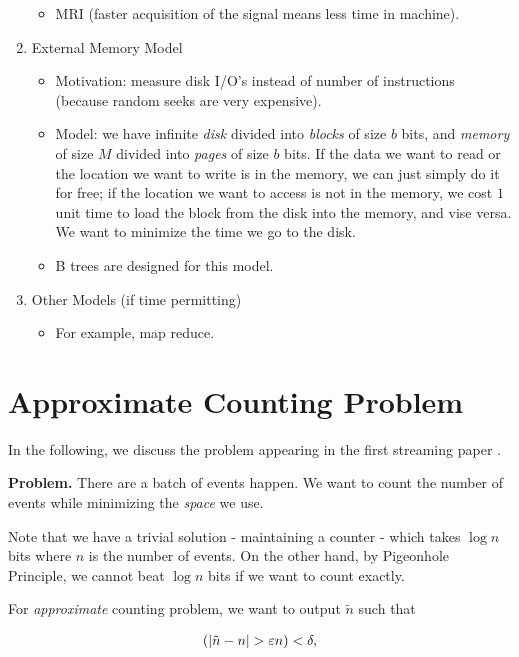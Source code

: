 \documentclass[11pt]{article}
\let\Pr\relax
\DeclareMathOperator*{\Pr}{\mathbb{P}}
\begin{document}
\begin{enumerate}
\begin{itemize}
            \item{MRI (faster acquisition of the signal means less time in machine).}
        \end{itemize}
    \item{External Memory Model}
        \begin{itemize}
            \item{Motivation: measure disk I/O's instead of number of instructions (because random seeks are very expensive).}
            \item{Model: we have infinite {\em disk} divided into {\em blocks} of size $b$ bits, and {\em memory} of size $M$ divided into {\em pages} of size $b$ bits. If the data we want to read or the location we want to write is in the memory, we can just simply do it for free; if the location we want to access is not in the memory, we cost $1$ unit time to load the block from the disk into the memory, and vise versa. We want to minimize the time we go to the disk.}
            \item{B trees are designed for this model.}
        \end{itemize}
    \item{Other Models (if time permitting)}
        \begin{itemize}
            \item{For example, map reduce. }
        \end{itemize}
\end{enumerate}

\section{Approximate Counting Problem}

In the following, we discuss the problem appearing in the first streaming paper \cite{AlonMS99}.

{\bf Problem.} There are a batch of events happen. We want to count the number of events while minimizing the {\em space} we use. 

Note that we have a trivial solution - maintaining a counter - which takes $\log n$ bits where $n$ is the number of events. On the other hand, by Pigeonhole Principle, we cannot beat $\log n$ bits if we want to count exactly.

For {\em approximate} counting problem, we want to output $\tilde{n}$ such that 

\begin{align} 
\Pr(|\tilde{n}-n|>\varepsilon n)<\delta,
\end{align} 
\end{document}
